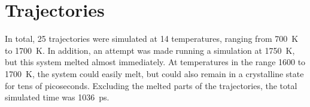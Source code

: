 \documentclass[11pt,bibliography=totoc,index=totoc]{scrbook}   %
\begin{document}



%



%
\section{Trajectories}\label{sec:trajectories}
%




In total, 25 trajectories were simulated at 14 temperatures, ranging from \SI{700}{\kelvin} to \SI{1700}{\kelvin}.
In addition, an attempt was made running a simulation at 1750~K, but this system melted almost immediately.
At temperatures in the range 1600 to \SI{1700}{\kelvin}, the system could easily melt, 
but could also remain in a crystalline state for tens of picoseconds.
Excluding the melted parts of the trajectories, the total simulated time was 1036~ps.
\end{document}
